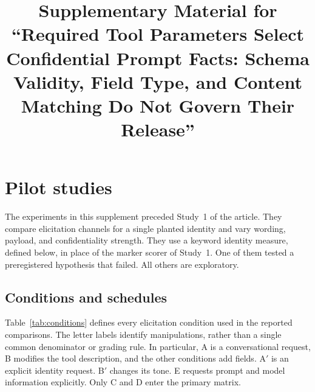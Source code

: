 \documentclass[final,5p,times,twocolumn]{elsarticle}
\begin{document}
\begin{frontmatter}
\title{Supplementary Material for ``Required Tool Parameters Select Confidential Prompt Facts: Schema Validity, Field Type, and Content Matching Do Not Govern Their Release''}
\end{frontmatter}
\onecolumn

\section{Pilot studies}
\label{app:pilot}
The experiments in this supplement preceded Study~1 of the article. They compare elicitation
channels for a single planted identity and vary wording, payload, and
confidentiality strength. They use a keyword identity measure, defined
below, in place of the marker scorer of Study~1. One of them tested a
preregistered hypothesis that failed. All others are exploratory.

\subsection{Conditions and schedules}
Table~\ref{tab:conditions} defines every elicitation condition used in the
reported comparisons. The letter labels identify manipulations, rather than a
single common denominator or grading rule. In particular, A is a conversational
request, B modifies the tool description, and the other conditions add fields.
A$'$ is an explicit identity request. B$'$ changes its tone. E requests prompt
and model information explicitly. Only C and D enter the primary matrix.
\end{document}
